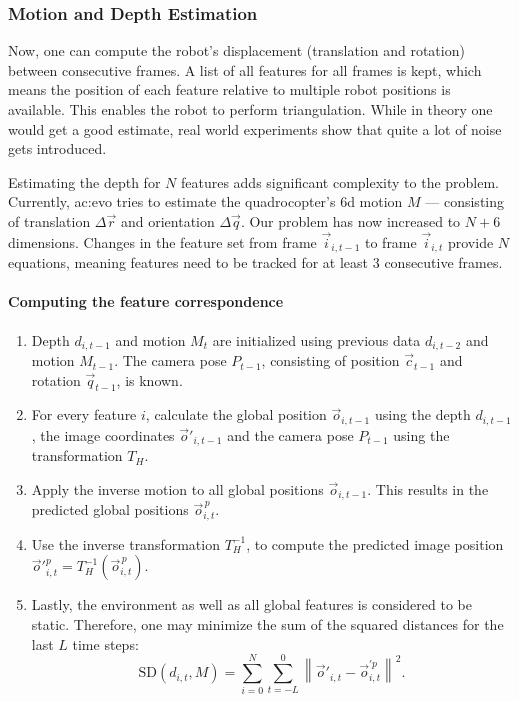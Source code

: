 \subsubsection{Motion and Depth Estimation}

Now, one can compute the robot's displacement (translation and rotation) between consecutive frames.
A list of all features for all frames is kept, which means the position of each feature relative to multiple robot positions is available.
This enables the robot to perform triangulation.
While in theory one would get a good estimate, real world experiments show that quite a lot of noise gets introduced.

Estimating the depth for $N$ features adds significant complexity to the problem.
Currently, \gls{ac:evo} tries to estimate the quadrocopter's 6d motion $M$ --- consisting of translation $\Delta \vec r$ and orientation $\Delta \vec q$.
Our problem has now increased to $N + 6$ dimensions.
Changes in the feature set from frame $\vec i_{i, t-1}$ to frame $\vec i_{i, t}$ provide $N$ equations, meaning features need to be tracked for at least $3$ consecutive frames.

\newcommand{\pr}{\ensuremath{{\,p}}}
\paragraph{Computing the feature correspondence}
\begin{enumerate}
  \item Depth $d_{i,t-1}$ and motion $M_{t}$ are initialized using previous data $d_{i,t-2}$ and motion $M_{t-1}$. The camera pose $P_{t-1}$, consisting of position $\vec c_{t-1}$ and rotation $\vec q_{t-1}$, is known.
  \item For every feature $i$, calculate the global position $\vec o_{i,t - 1}$ using the depth $d_{i,t-1}$, the image coordinates $\vec o'_{i,t - 1}$ and the camera pose $P_{t-1}$ using the transformation $T_H$.
  \item Apply the inverse motion to all global positions $\vec o_{i, t-1}$. This results in the predicted global positions $\vec o^\pr_{i, t}$.
  \item Use the inverse transformation $T^{-1}_H$, to compute the predicted image position $\vec{o}'^{p}_{i, t} = T^{-1}_H \left( \vec{o}^\pr_{i, t} \right)$.
  \item Lastly, the environment as well as all global features is considered to be static. Therefore, one may minimize the sum of the squared distances for the last $L$ time steps:
  \[\textrm{SD} \left( d_{i, t}, M \right) = \sum_{i=0}^{N} \sum_{t=-L}^{0} \left\lVert \vec o'_{i,t} - \vec o^{\prime p}_{i,t} \right\rVert^2 .\]
\end{enumerate}

